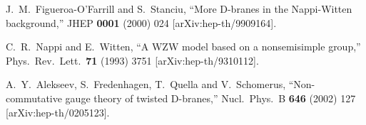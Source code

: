 \documentclass[11pt, a4paper]{article}
\newcommand{\1}{\mathbb{1}}
\begin{document}
\begin{thebibliography}{99}
  J.~M.~Figueroa-O'Farrill and S.~Stanciu,
  ``More D-branes in the Nappi-Witten background,''
  JHEP {\bf 0001} (2000) 024
  [arXiv:hep-th/9909164].

  C.~R.~Nappi and E.~Witten,
  ``A WZW model based on a nonsemisimple group,''
  Phys.\ Rev.\ Lett.\  {\bf 71} (1993) 3751
  [arXiv:hep-th/9310112].
  
  A.~Y.~Alekseev, S.~Fredenhagen, T.~Quella and V.~Schomerus,
  ``Non-commutative gauge theory of twisted D-branes,''
  Nucl.\ Phys.\ B {\bf 646} (2002) 127
  [arXiv:hep-th/0205123].

\end{thebibliography}
\end{document}
